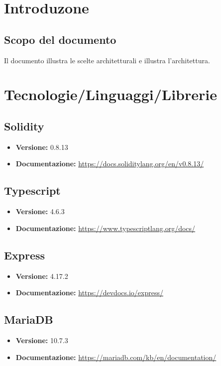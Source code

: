\documentclass[a4paper, 12pt]{article}
\begin{document}
\makefrontpage

\makeversioni

\tableofcontents
\clearpage

\section{Introduzone}
\subsection{Scopo del documento}
Il documento illustra le scelte architetturali e illustra l'architettura.

\section{Tecnologie/Linguaggi/Librerie}

\subsection{Solidity}
\begin{itemize}
\item \textbf{Versione:} 0.8.13
\item \textbf{Documentazione:} \href{https://docs.soliditylang.org/en/v0.8.13/}{https://docs.soliditylang.org/en/v0.8.13/}
\end{itemize}

\subsection{Typescript}
\begin{itemize}
\item \textbf{Versione:} 4.6.3
\item \textbf{Documentazione:} \href{https://www.typescriptlang.org/docs/}{https://www.typescriptlang.org/docs/}
\end{itemize}

\subsection{Express}
\begin{itemize}
\item \textbf{Versione:} 4.17.2
\item \textbf{Documentazione:} \href{https://devdocs.io/express/}{https://devdocs.io/express/}
\end{itemize}

\subsection{MariaDB}
\begin{itemize}
\item \textbf{Versione:} 10.7.3
\item \textbf{Documentazione:} \href{https://mariadb.com/kb/en/documentation/}{https://mariadb.com/kb/en/documentation/}
\end{itemize}
\end{document}
